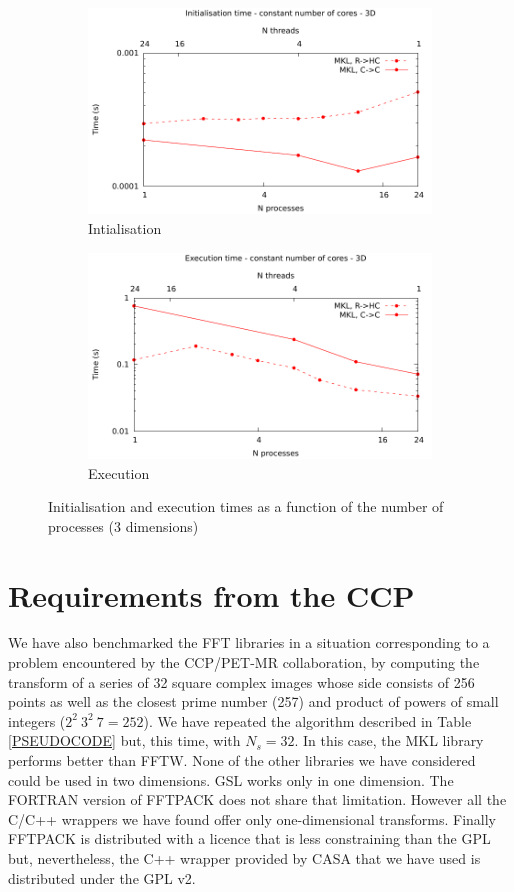 \documentclass[12pt, a4paper]{article}
\begin{document}
\begin{figure}[H]
\captionsetup{width=0.8\linewidth}
\centering
\begin{subfigure}{.5\textwidth}
\centering
\includegraphics[width=.9\linewidth]{graphs/const-init-3d.pdf}
\caption{Intialisation}
\label{3DCONSTI}
\end{subfigure}%
\begin{subfigure}{.5\textwidth}
\centering
\includegraphics[width=.9\linewidth]{graphs/const-exec-3d.pdf}
\caption{Execution}
\label{3DCONSTE}
\end{subfigure}
\caption{Initialisation and execution times as a function of the number of processes (3 dimensions)}
\label{3DCONST}
\end{figure}

\section{Requirements from the CCP}\label{CCPPETMR}
We have also benchmarked the FFT libraries in a situation corresponding to a problem encountered by the CCP/PET-MR collaboration, by computing the transform of a series of 32 square complex images whose side consists of 256 points as well as the closest prime number (257) and product of powers of small integers ($2^2\ 3^2\ 7=252$). We have repeated the algorithm described in Table \ref{PSEUDOCODE} but, this time, with $N_s=32$. In this case, the MKL library performs better than FFTW. None of the other libraries we have considered could be used in two dimensions. GSL works only in one dimension. The FORTRAN version of FFTPACK does not share that limitation. However all the C/C++ wrappers we have found offer only one-dimensional transforms. Finally FFTPACK is distributed with a licence that is less constraining than the GPL but, nevertheless, the C++ wrapper provided by CASA that we have used is distributed under the GPL v2.
\end{document}
